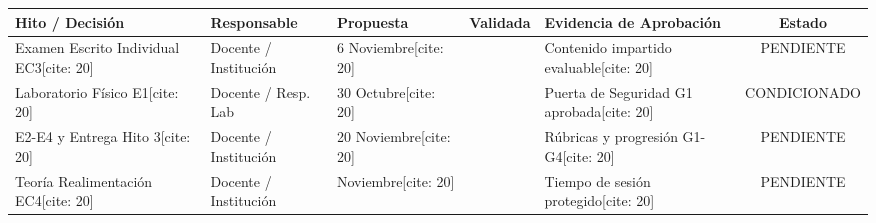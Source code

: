 \documentclass[10pt, a4paper, landscape]{article}
\begin{document}
\par\vspace{0.2cm}\noindent
\renewcommand{\arraystretch}{1.5}
\begin{tabularx}{\textwidth}{|>{\raggedright\arraybackslash}p{4cm}|p{3.5cm}|p{2cm}|p{2cm}|>{\raggedright\arraybackslash}X|c|}
\hline
\rowcolor{ucbblue!20}
\textbf{Hito / Decisión} & \textbf{Responsable} & \textbf{Propuesta} & \textbf{Validada} & \textbf{Evidencia de Aprobación} & \textbf{Estado} \\ \hline
Examen Escrito Individual EC3[cite: 20] & Docente / Institución & 6 Noviembre[cite: 20] & & Contenido impartido evaluable[cite: 20] & PENDIENTE \\ \hline
Laboratorio Físico E1[cite: 20] & Docente / Resp. Lab & 30 Octubre[cite: 20] & & Puerta de Seguridad G1 aprobada[cite: 20] & CONDICIONADO \\ \hline
E2-E4 y Entrega Hito 3[cite: 20] & Docente / Institución & 20 Noviembre[cite: 20] & & Rúbricas y progresión G1-G4[cite: 20] & PENDIENTE \\ \hline
Teoría Realimentación EC4[cite: 20] & Docente / Institución & Noviembre[cite: 20] & & Tiempo de sesión protegido[cite: 20] & PENDIENTE \\ \hline
\end{tabularx}
\end{document}
